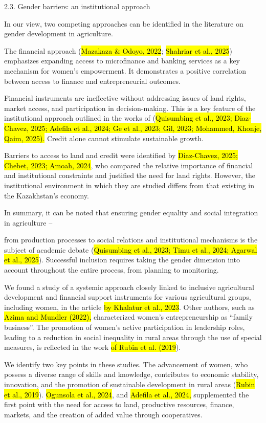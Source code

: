 \documentclass[
]{article}
\begin{document}
2.3. Gender barriers: an institutional approach

In our view, two competing approaches can be identified in the
literature on gender development in agriculture.

The financial approach (\hl{Mazakaza \& Odoyo, 2022}; \hl{Shahriar et
al., 2025}) emphasizes expanding access to microfinance and banking
services as a key mechanism for women's empowerment. It demonstrates a
positive correlation between access to finance and entrepreneurial
outcomes.

Financial instruments are ineffective without addressing issues of land
rights, market access, and participation in decision-making. This is a
key feature of the institutional approach outlined in the works of
(\hl{Quisumbing et al., 2023; Diaz-Chavez, 2025; Adefila et al., 2024;
Ge et al., 2023; Gil, 2023; Mohammed, Khonje, Qaim, 2025).} Credit alone
cannot stimulate sustainable growth.

Barriers to access to land and credit were identified by
\hl{Diaz-Chavez, 2025; Chebet, 2023; Amoah, 2024}, who compared the
relative importance of financial and institutional constraints and
justified the need for land rights. However, the institutional
environment in which they are studied differs from that existing in the
Kazakhstan's economy.

In summary, it can be noted that ensuring gender equality and social
integration in agriculture --

from production processes to social relations and institutional
mechanisms is the subject of academic debate (\hl{Quisumbing et al.,
2023; Timu et al., 2024; Agarwal et al., 2025}). Successful inclusion
requires taking the gender dimension into account throughout the entire
process, from planning to monitoring.

We found a study of a systemic approach closely linked to inclusive
agricultural development and financial support instruments for various
agricultural groups, including women, in the article \hl{by Khalatur et
al., 2023}. Other authors, such as \hl{Azima and Mundler (2022),}
characterized women's entrepreneurship as ``family business''. The
promotion of women's active participation in leadership roles, leading
to a reduction in social inequality in rural areas through the use of
special measures, is reflected in the work \hl{of Rubin et al. (2019}).

We identify two key points in these studies. The advancement of women,
who possess a diverse range of skills and knowledge, contributes to
economic stability, innovation, and the promotion of sustainable
development in rural areas (\hl{Rubin et al., 2019}). \hl{Ogunsola et
al., 2024}, and \hl{Adefila et al., 2024,} supplemented the first point
with the need for access to land, productive resources, finance,
markets, and the creation of added value through cooperatives.
\end{document}
